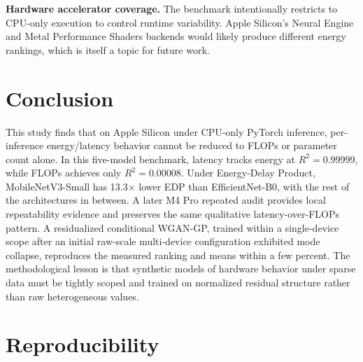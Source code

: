 \documentclass[conference]{IEEEtran}
\begin{document}
\textbf{Hardware accelerator coverage.} The benchmark intentionally restricts
to CPU-only execution to control runtime variability. Apple Silicon's Neural
Engine and Metal Performance Shaders backends would likely produce different
energy rankings, which is itself a topic for future work.

\section{Conclusion}
This study finds that on Apple Silicon under CPU-only PyTorch inference,
per-inference energy/latency behavior cannot be reduced to FLOPs or parameter
count alone.
In this five-model benchmark, latency tracks energy at $R^2 = 0.99999$,
while FLOPs achieves only $R^2 = 0.00008$. Under Energy-Delay Product,
MobileNetV3-Small has 13.3$\times$ lower EDP than EfficientNet-B0, with the
rest of the architectures in between. A later M4 Pro repeated audit provides
local repeatability evidence and preserves the same qualitative
latency-over-FLOPs pattern. A residualized conditional WGAN-GP,
trained within a single-device
scope after an initial raw-scale multi-device configuration exhibited mode
collapse, reproduces the measured ranking and means within a few percent.
The methodological lesson is that synthetic models of hardware behavior
under sparse data must be tightly scoped and trained on normalized residual
structure rather than raw heterogeneous values.

\appendices
\section{Reproducibility}
\label{sec:appendix}
\end{document}
